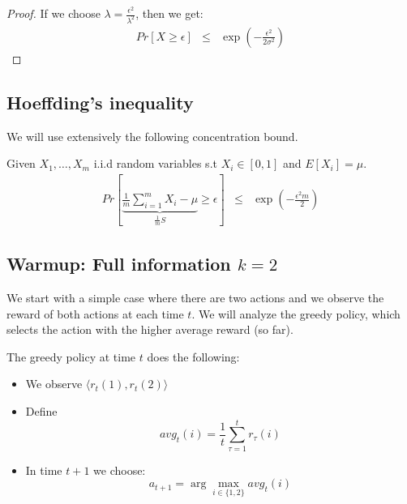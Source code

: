 {\begin{leftbar}
\begin{proof}
If we choose $\lambda=\frac{\epsilon^{2}}{\lambda^{2}}$, then we
get:
\[
\begin{array}{ccc}
Pr[X\geqslant\epsilon] & \le & \exp(-\frac{\epsilon^{2}}{2\sigma^{2}})\end{array}
\]
\end{proof}
\end{leftbar}

\subsection{Hoeffding's inequality}
}

We will use extensively the following concentration bound.

\begin{theorem}
\label{thm:hoeffding}
%
Given $X_{1},\dots,X_{m}$ i.i.d random
variables s.t $X_{i}\in[0,1]$ and $E[X_{i}]=\mu$.
\[
\begin{array}{ccc}
Pr[\underbrace{\frac{1}{m}{\displaystyle \sum_{i=1}^{m}X_{i}-\mu}}_{\frac{1}{m}S}\ge\epsilon] & \le & \exp(-\frac{\epsilon^{2}m}{2})\end{array}
\]
\end{theorem}


\subsection{Warmup: Full information $k=2$ }

We start with a simple case where there are two actions and we
observe the reward of both actions at each time $t$. We will analyze
the greedy policy, which selects the action with the higher average
reward (so far).

The greedy policy at time $t$ does the following:
\begin{itemize}
\item We observe $\big\langle r_{t}(1),r_{t}(2)\big\rangle$
\item Define
\[
avg_{t}(i)=\frac{1}{t} \sum_{\tau=1}^{t}r_{\tau}(i)
\]
\item In time $t+1$ we choose:
\[
a_{t+1}=\arg\max_{i\in\{1,2\}}avg_{t}(i)
\]
\end{itemize}


